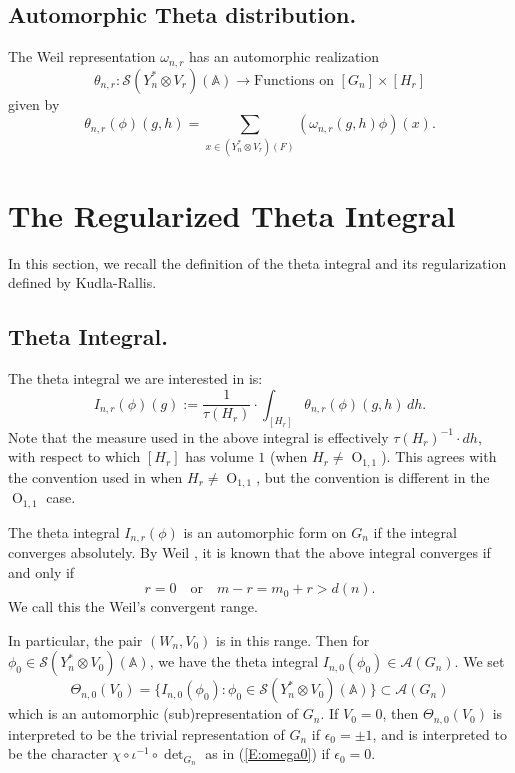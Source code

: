 \documentclass[10pt]{amsart}
\theoremstyle{plain}
\numberwithin{equation}{section}
\begin{document}
\vskip 15pt

\subsection{\bf Automorphic Theta distribution.}

The Weil representation $\omega_{n, r}$ has an automorphic realization 
\[  
\theta_{n,r}:  \mathcal{S}(Y_n^*\otimes V_r)({\mathbb{A}})  \longrightarrow 
\text{Functions on $[G_n] \times [H_r]$} 
\]
given by
\[  
\theta_{n,r}(\phi)(g,h) = \sum_{x \in (Y_n^*\otimes V_r)(F)}
(\omega_{n,r}(g,h)\phi) (x). 
\]

\vskip 15pt

 
 \section{\bf The Regularized  Theta Integral}  \label{S:theta}
 
 In this section, we recall the definition of the theta integral and
 its regularization defined by Kudla-Rallis.

 \vskip 5pt
 
 \subsection{\bf Theta Integral.} \label{SS:theta}
 The theta integral we are interested in is:
  \[  
I_{n,r}(\phi)(g) := \frac{1}{\tau(H_r)} \cdot  \int_{[H_r]}  \theta_{n,r}(\phi)(g,h) \, dh. 
\]
Note that the measure used in the above integral is effectively $\tau(H_r)^{-1} \cdot dh$, with respect to which $[H_r]$ has volume $1$ (when $H_r \ne {\operatorname{O}}_{1,1}$). This agrees with the convention used in \cite{KR1,KR2, Ik, I1,I2, I3, Y2} when $H_r \ne {\operatorname{O}}_{1,1}$, but the convention is different in the ${\operatorname{O}}_{1,1}$ case.
\vskip 5pt

The theta integral $I_{n,r}(\phi)$ is an automorphic form on $G_n$ if the integral converges absolutely. 
 By Weil \cite{We}, it is known that the above integral converges if and only if 
  \[  r = 0 \quad \text{or} \quad m-r = m_0 + r >  d(n). \]
 We call this the Weil's convergent range.

 \vskip 5pt

 In particular, the pair $(W_n, V_0)$ is in this range. Then for
 $\phi_0 \in \mathcal{S}(Y_n^* \otimes V_0)({\mathbb{A}})$, we have the theta
 integral $I_{n,0}(\phi_0)\in {\mathcal{A}}(G_n)$. We set
 \[  
\Theta_{n,0}(V_0)  = \{I_{n,0}(\phi_0) :  \phi_0 \in
\mathcal{S}(Y_n^* \otimes V_0)({\mathbb{A}})\}\subset {\mathcal{A}}(G_n) 
\]
 which is an automorphic (sub)representation of $G_n$. If $V_0 = 0$,
 then $\Theta_{n,0}(V_0)$ is interpreted to be the trivial
 representation of $G_n$ if $\epsilon_0 = \pm 1$, and is interpreted to
 be the character $\chi \circ \iota^{-1} \circ \det_{G_n}$ as in
 (\ref{E:omega0}) if $\epsilon_0=0$.
 \vskip 5pt
 
\end{document}
